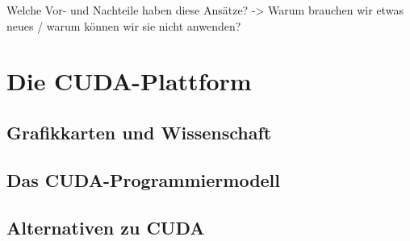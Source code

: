 Welche Vor- und Nachteile haben diese Ansätze? -> Warum brauchen wir etwas neues / warum können wir sie nicht anwenden?


\section{Die CUDA{\textregistered}-Plattform}

\subsection{Grafikkarten und Wissenschaft}

\subsection{Das CUDA{\textregistered}-Programmiermodell}

\subsection{Alternativen zu CUDA{\textregistered}}
